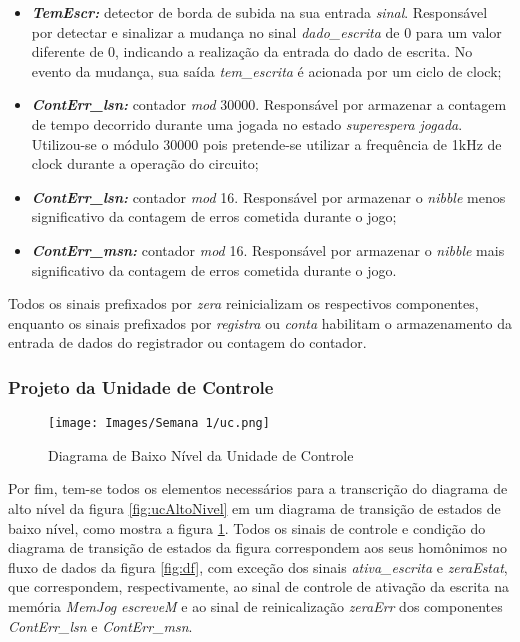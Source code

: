 \documentclass[amsmath,amssymb,floatfix]{report}
\begin{document}
\begin{itemize}
    \item \textbf{\textit{TemEscr:}} detector de borda de subida na sua entrada \textit{sinal}. Responsável por detectar e sinalizar a mudança no sinal \textit{dado\_escrita} de 0 para um valor diferente de 0, indicando a realização da entrada do dado de escrita. No evento da mudança, sua saída \textit{tem\_escrita} é acionada por um ciclo de clock;
    \item \textbf{\textit{ContErr\_lsn:}} contador \textit{mod} 30000. Responsável por armazenar a contagem de tempo decorrido durante uma jogada no estado \textit{superespera jogada}. Utilizou-se o módulo 30000 pois pretende-se utilizar a frequência de 1kHz de clock durante a operação do circuito;
    \item \textbf{\textit{ContErr\_lsn:}} contador \textit{mod} 16. Responsável por armazenar o \textit{nibble} menos significativo da contagem de erros cometida durante o jogo;
    \item \textbf{\textit{ContErr\_msn:}} contador \textit{mod} 16. Responsável por armazenar o \textit{nibble} mais significativo da contagem de erros cometida durante o jogo.
\end{itemize}

Todos os sinais prefixados por \textit{zera} reinicializam os respectivos componentes, enquanto os sinais prefixados por \textit{registra} ou \textit{conta} habilitam o armazenamento da entrada de dados do registrador ou contagem do contador.

\subsubsection{Projeto da Unidade de Controle}
\label{subsubsec:uc1}

\begin{figure}[H]
    \centering
    \texttt{[image: Images/Semana 1/uc.png]}
    \caption{Diagrama de Baixo Nível da Unidade de Controle}
    \label{fig:uc}
\end{figure}

Por fim, tem-se todos os elementos necessários para a transcrição do diagrama de alto nível da figura \ref{fig:ucAltoNivel} em um diagrama de transição de estados de baixo nível, como mostra a figura \ref{fig:uc}. Todos os sinais de controle e condição do diagrama de transição de estados da figura correspondem aos seus homônimos no fluxo de dados da figura \ref{fig:df}, com exceção dos sinais \textit{ativa\_escrita} e \textit{zeraEstat}, que correspondem, respectivamente, ao sinal de controle de ativação da escrita na memória \textit{MemJog} \textit{escreveM} e ao sinal de reinicalização \textit{zeraErr} dos componentes \textit{ContErr\_lsn} e \textit{ContErr\_msn}.
\end{document}
